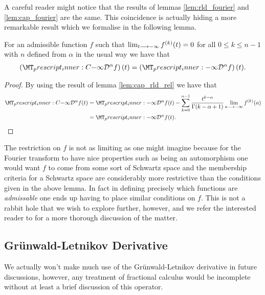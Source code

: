 A careful reader might notice that the results of lemmas \ref{lem:rld_fourier} and \ref{lem:cap_fourier} are the same. This coincidence is actually hiding a more remarkable result which we formalise in the following lemma.
\begin{mdframed}[innertopmargin=10pt]
\begin{lemma}
    For an admissible function $ f $ such that $ \lim_{t \longrightarrow -\infty} f^{(k)}(t) = 0 $ for all $ 0 \leq k \leq n-1 $ with $ n $ defined from $ \alpha $ in the usual way we have that
    \begin{align}
        \left(\prescript{C}{-\infty}{\mathcal{D}}^\alpha f\right)(t) = \left( \prescript{}{-\infty}{\mathcal{D}}^\alpha f \right)(t).
    \end{align}
\end{lemma}
\end{mdframed}
\begin{proof}
    By using the result of lemma \ref{lem:cap_rld_rel} we have that
    \begin{align}
        \prescript{C}{-\infty}{\mathcal{D}}^\alpha f(t) &= \prescript{}{-\infty}{\mathcal{D}}^\alpha f(t) - \sum_{k=0}^{n-1} \frac{t^{k-\alpha}}{\Gamma(k - \alpha + 1)}\lim_{a \lra -\infty}f^{(k)}(a) \\
    &=  \prescript{}{-\infty}{\mathcal{D}}^\alpha f(t). 
    \end{align}
\end{proof}
The restriction on $ f $ is not as limiting as one might imagine because for the Fourier transform to have nice properties such as being an automorphism one would want $ f $ to come from some sort of Schwartz space and the membership criteria for a Schwartz space are considerably more restrictive than the conditions given in the above lemma. In fact in defining precisely which functions are \emph{admissable} one ends up having to place similar conditions on $ f $. This is not a rabbit hole that we wish to explore further, however, and we refer the interested reader to \cite{Samko1993} for a more thorough discussion of the matter. 

\subsection{Gr{\"u}nwald-Letnikov Derivative} 
We actually won't make much use of the Gr{\"u}nwald-Letnikov derivative in future discussions, however, any treatment of fractional calculus would be incomplete without at least a brief discussion of this operator.

